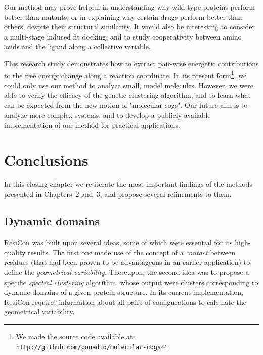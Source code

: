 \documentclass[a4paper,11pt,twoside]{book}%
\begin{document}
Our method may prove helpful in understanding why wild-type proteins perform better than mutants, or in explaining why certain drugs perform better than others, despite their structural similarity.
It would also be interesting to consider a multi-stage induced fit docking, and to study cooperativity between amino acids and the ligand along a collective variable.

This research study demonstrates how to extract pair-wise energetic contributions to the free energy change along a reaction coordinate.
In its present form\footnote{We made the source code available at: \texttt{http://github.com/ponadto/molecular-cogs}}, we could only use our method to analyze small, {\color{black}model} molecules.
However, {\color{black}we were able} to verify the efficacy of the genetic clustering algorithm, and to learn what can be expected from the new notion of "molecular cogs".
Our future aim is to analyze more complex systems, and to develop a publicly available implementation of our method for practical applications.




\chapter{Conclusions}

In this closing chapter we re-iterate the most important findings of the methods presented in Chapters~2 and~3, and propose several refinements to them.

\section{Dynamic domains}

ResiCon was built upon several ideas, some of which were essential for its high-quality results.
The first one made use of the concept of a \emph{contact} between residues (that had been proven to be advantageous in an earlier application) to define the \emph{geometrical variability}.
Thereupon, the second idea was to propose a specific \emph{spectral clustering} algorithm, whose output were clusters corresponding to dynamic domains of a given protein structure.
In its current implementation, ResiCon requires information about all pairs of configurations to calculate the geometrical variability. 
\end{document}
